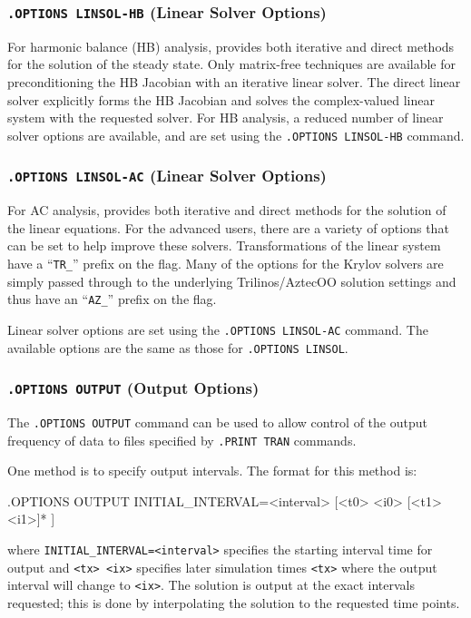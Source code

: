\subsubsection{\texttt{.OPTIONS LINSOL-HB} (Linear Solver Options)}

For harmonic balance (HB) analysis, \Xyce{} provides both iterative 
and direct methods for the solution of the steady state.  Only matrix-free techniques
are available for preconditioning the HB Jacobian with an iterative linear solver.
The direct linear solver explicitly forms the HB Jacobian and solves the complex-valued
linear system with the requested solver.
For HB analysis, a reduced number of linear solver options are available,  
and are set using the \texttt{.OPTIONS LINSOL-HB} command.



\subsubsection{\texttt{.OPTIONS LINSOL-AC} (Linear Solver Options)}

For AC analysis, \Xyce{} provides both iterative and direct methods for the
solution of the linear equations. For the advanced users, there are a variety 
of options that can be set to help improve these solvers.  Transformations 
of the linear system have a ``\verb+TR_+'' prefix on the flag.  Many of the 
options for the Krylov solvers are simply passed through to the underlying
Trilinos/AztecOO
solution settings and thus have an ``\verb+AZ_+'' prefix on the flag.

Linear solver options are set using the \texttt{.OPTIONS LINSOL-AC}
command.  The available options
are the same as those for \texttt{.OPTIONS LINSOL}.


\subsubsection{\texttt{.OPTIONS OUTPUT} (Output Options)}

The   \verb+.OPTIONS OUTPUT+
command can be used to allow control of the output frequency of data to files specified
by  \verb+.PRINT TRAN+ commands.  

One method is to specify output intervals.  The format for this method is:
\begin{vquote}
.OPTIONS OUTPUT INITIAL_INTERVAL=<interval> [<t0> <i0> [<t1> <i1>]* ]
\end{vquote}
where \verb+INITIAL_INTERVAL=<interval>+ specifies the starting interval time
for output and \verb+<tx> <ix>+ specifies later simulation times \verb+<tx>+
where the output interval will change to \verb+<ix>+. The solution is output at the
exact intervals requested; this is done by interpolating the solution
to the requested time points.

